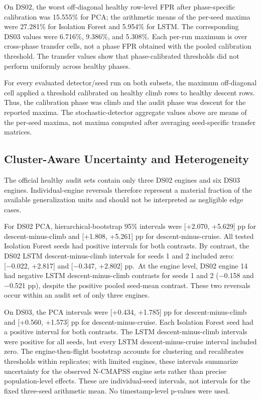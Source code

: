 \documentclass[preprint,12pt]{elsarticle}
\begin{document}
On DS02, the worst off-diagonal healthy row-level FPR after phase-specific calibration was 15.555\% for PCA; the arithmetic means of the per-seed maxima were 27.281\% for Isolation Forest and 5.954\% for LSTM. The corresponding DS03 values were 6.716\%, 9.386\%, and 5.308\%. Each per-run maximum is over cross-phase transfer cells, not a phase FPR obtained with the pooled calibration threshold. The transfer values show that phase-calibrated thresholds did not perform uniformly across healthy phases.

For every evaluated detector/seed run on both subsets, the maximum off-diagonal cell applied a threshold calibrated on healthy climb rows to healthy descent rows. Thus, the calibration phase was climb and the audit phase was descent for the reported maxima. The stochastic-detector aggregate values above are means of the per-seed maxima, not maxima computed after averaging seed-specific transfer matrices.

\subsection{Cluster-Aware Uncertainty and Heterogeneity}\label{cluster-aware-uncertainty-and-heterogeneity}

The official healthy audit sets contain only three DS02 engines and six DS03 engines. Individual-engine reversals therefore represent a material fraction of the available generalization units and should not be interpreted as negligible edge cases.

For DS02 PCA, hierarchical-bootstrap 95\% intervals were {[}+2.070, +5.629{]} pp for descent-minus-climb and {[}+1.808, +5.261{]} pp for descent-minus-cruise. All tested Isolation Forest seeds had positive intervals for both contrasts. By contrast, the DS02 LSTM descent-minus-climb intervals for seeds 1 and 2 included zero: {[}−0.022, +2.817{]} and {[}−0.347, +2.802{]} pp.~At the engine level, DS02 engine 14 had negative LSTM descent-minus-climb contrasts for seeds 1 and 2 (−0.158 and −0.521 pp), despite the positive pooled seed-mean contrast. These two reversals occur within an audit set of only three engines.

On DS03, the PCA intervals were {[}+0.434, +1.785{]} pp for descent-minus-climb and {[}+0.560, +1.573{]} pp for descent-minus-cruise. Each Isolation Forest seed had a positive interval for both contrasts. The LSTM descent-minus-climb intervals were positive for all seeds, but every LSTM descent-minus-cruise interval included zero. The engine-then-flight bootstrap accounts for clustering and recalibrates thresholds within replicates; with limited engines, these intervals summarize uncertainty for the observed N-CMAPSS engine sets rather than precise population-level effects. These are individual-seed intervals, not intervals for the fixed three-seed arithmetic mean. No timestamp-level p-values were used.
\end{document}
